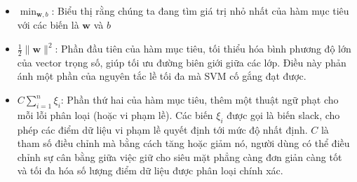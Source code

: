 \documentclass[a4paper]{article}
\begin{document}
\begin{itemize}
    \item \(\min_{\mathbf{w}, b}\): Biểu thị rằng chúng ta đang tìm giá trị nhỏ nhất của hàm mục tiêu với các biến là \(\mathbf{w}\) và \(b\) 
    \item \(\frac{1}{2} \|\mathbf{w}\|^2\): Phần đầu tiên của hàm mục tiêu, tối thiểu hóa bình phương độ lớn của vector trọng số, giúp tối ưu đường biên giới giữa các lớp. Điều này phản ánh một phần của nguyên tắc lề tối đa mà SVM cố gắng đạt được.
    \item \(C \sum_{i=1}^n \xi_i\): Phần thứ hai của hàm mục tiêu, thêm một thuật ngữ phạt cho mỗi lỗi phân loại (hoặc vi phạm lề). Các biến \(\xi_i\) được gọi là biến slack, cho phép các điểm dữ liệu vi phạm lề quyết định tới mức độ nhất định. \(C\) là tham số điều chỉnh mà bằng cách tăng hoặc giảm nó, người dùng có thể điều chỉnh sự cân bằng giữa việc giữ cho siêu mặt phẳng càng đơn giản càng tốt và tối đa hóa số lượng điểm dữ liệu được phân loại chính xác.
\end{itemize}
\end{document}
